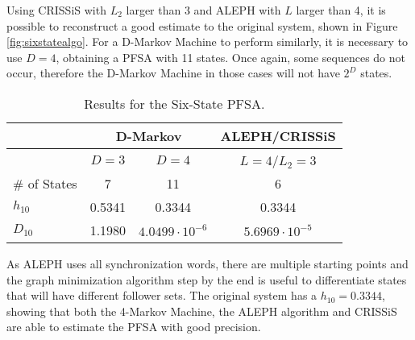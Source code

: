 {Using CRISSiS with $L_2$ larger than 3 and ALEPH with $L$ larger than 4, it is possible to reconstruct a good estimate to the original system, shown in Figure \ref{fig:sixstatealgo}. For a D-Markov Machine to perform similarly, it is necessary to use $D=4$, obtaining a PFSA with 11 states. Once again, some sequences do not occur, therefore the D-Markov Machine in those cases will not have $2^D$ states.

\begin{table}
\centering
\caption{Results for the Six-State PFSA. \label{tab:sixstate}}
\begin{tabular}{|l|c|c|c|}
\hline
 & \multicolumn{2}{c|}{D-Markov} & ALEPH/CRISSiS \\
 \hline
 & $D=3$ & $D=4$ & $L=4$/$L_2=3$ \\
\hline
\# of States & 7 & 11 & 6 \\ 
$h_{10}$ & 0.5341 & 0.3344 & 0.3344 \\
$D_{10}$ & 1.1980 & $4.0499\cdot 10^{-6}$ &  $5.6969\cdot10^{-5}$ \\
 \hline
\end{tabular}
\end{table}


As ALEPH uses all synchronization words, there are multiple starting points and the graph minimization algorithm step by the end is useful to differentiate states that will have different follower sets. The original system has a $h_{10} = 0.3344$, showing that both the 4-Markov Machine, the ALEPH algorithm and CRISSiS are able to estimate the PFSA with good precision.


}
